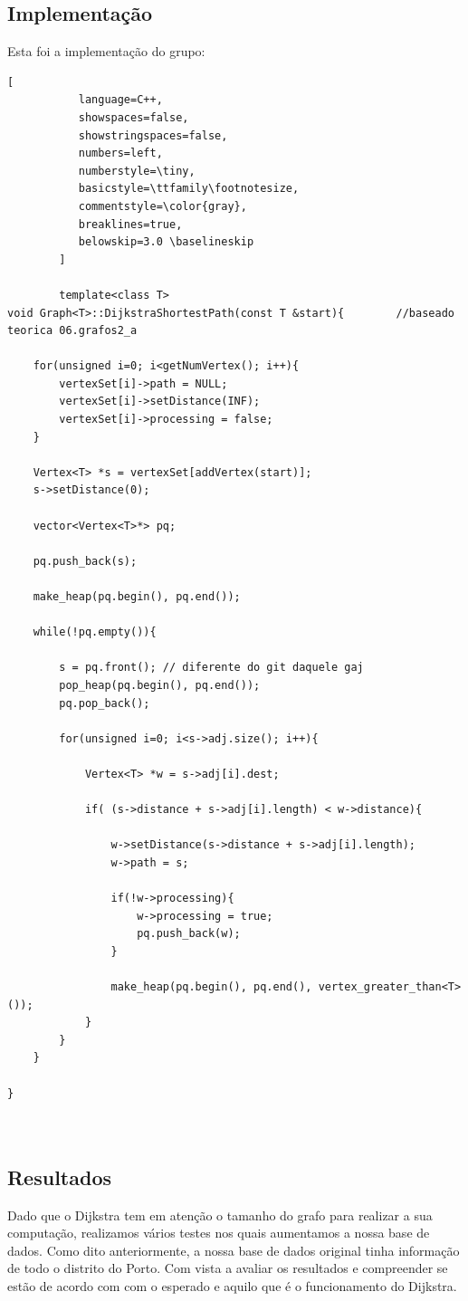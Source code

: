 \documentclass[a4paper]{article}
\begin{document}
\subsection{Implementação}


Esta foi a implementação do grupo:


\begin{lstlisting}[
           language=C++,
           showspaces=false,
           showstringspaces=false,
           numbers=left,
           numberstyle=\tiny,
           basicstyle=\ttfamily\footnotesize,
           commentstyle=\color{gray},
           breaklines=true,
           belowskip=3.0 \baselineskip
        ]
        
        template<class T>
void Graph<T>::DijkstraShortestPath(const T &start){		//baseado teorica 06.grafos2_a

	for(unsigned i=0; i<getNumVertex(); i++){
		vertexSet[i]->path = NULL;
		vertexSet[i]->setDistance(INF);
		vertexSet[i]->processing = false;
	}

	Vertex<T> *s = vertexSet[addVertex(start)];
	s->setDistance(0);

	vector<Vertex<T>*> pq;

	pq.push_back(s);

	make_heap(pq.begin(), pq.end());

	while(!pq.empty()){

		s = pq.front(); // diferente do git daquele gaj
		pop_heap(pq.begin(), pq.end());
		pq.pop_back();

		for(unsigned i=0; i<s->adj.size(); i++){

			Vertex<T> *w = s->adj[i].dest;

			if( (s->distance + s->adj[i].length) < w->distance){

				w->setDistance(s->distance + s->adj[i].length);
				w->path = s;

				if(!w->processing){
					w->processing = true;
					pq.push_back(w);
				}

				make_heap(pq.begin(), pq.end(), vertex_greater_than<T>());
			}
		}
	}

}
        
       
\end{lstlisting}


\subsection{Resultados}

Dado que o Dijkstra tem em atenção o tamanho do grafo para realizar a sua computação, realizamos vários testes nos quais aumentamos a nossa base de dados. Como dito anteriormente, a nossa base de dados original tinha informação de todo o distrito do Porto. Com vista a avaliar os resultados e compreender se estão de acordo com com o esperado e aquilo que é o funcionamento do Dijkstra. 
\end{document}
